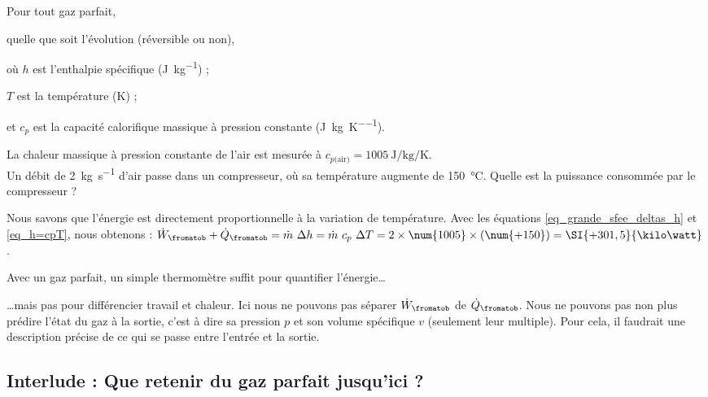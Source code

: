 			\begin{equationterms}
				\item Pour tout gaz parfait,
				\item quelle que soit l’évolution (réversible ou non),
				\item où \tab $h$ 	\tab est l’enthalpie spécifique (\si{\joule\per\kilogram}) ;
				\item 	\tab $T$ 	\tab est la température (\si{\kelvin}) ;
				\item et \tab $c_p$ 	\tab est la capacité calorifique massique à pression constante (\si{\joule\per\kilogram\per\kelvin}).
			\end{equationterms}
		
		
		\begin{anexample}
			La chaleur massique à pression constante de l’air est mesurée à $c_{p\text{(air)}} = \SI{1005}{\joule\per\kilogram\per\kelvin}$.\\
			Un débit de \SI{2}{\kilogram\per\second} d’air passe dans un compresseur, où sa température augmente de \SI{150}{\degreeCelsius}. Quelle est la puissance consommée par le compresseur ?
				\begin{answer}
					Nous savons que l’énergie est directement proportionnelle à la variation de température. Avec les équations \ref{eq_grande_sfee_deltas_h} et \ref{eq_h=cpT}, nous obtenons : $\dot W_\fromatob + \dot Q_\fromatob = \dot m \ \Delta h = \dot m \ c_p \ \Delta T = 2 \times \num{1005} \times (\num{+150}) = \SI{+301,5}{\kilo\watt}$. 
				\end{answer}
					\begin{remark}Avec un gaz parfait, un simple thermomètre suffit pour quantifier l’énergie…\end{remark}
					\begin{remark}…mais pas pour différencier travail et chaleur. Ici nous ne pouvons pas séparer $\dot W_\fromatob$ de $\dot Q_\fromatob$. Nous ne pouvons pas non plus prédire l’état du gaz à la sortie, c’est à dire sa pression $p$ et son volume spécifique $v$ (seulement leur multiple). Pour cela, il faudrait une description précise de ce qui se passe entre l’entrée et la sortie.\end{remark}
		\end{anexample}


	\subsection{Interlude : Que retenir du gaz parfait jusqu’ici ?}

